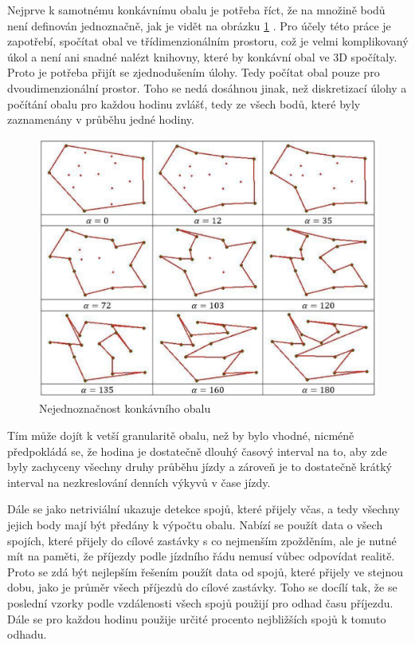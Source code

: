 Nejprve k samotnému konkávnímu obalu je potřeba říct, že na množině bodů není definován jednoznačně, jak je vidět na obrázku \ref{fig:konkavni_obal_nejednoznacny} \citet{Asaeedi}. Pro účely této práce je zapotřebí, spočítat obal ve třídimenzionálním prostoru, což je velmi komplikovaný úkol a není ani snadné nalézt knihovny, které by konkávní obal ve 3D spočítaly. Proto je potřeba přijít se zjednodušením úlohy. Tedy počítat obal pouze pro dvoudimenzionální prostor. Toho se nedá dosáhnou jinak, než diskretizací úlohy a počítání obalu pro každou hodinu zvlášť, tedy ze všech bodů, které byly zaznamenány v průběhu jedné hodiny.


\begin{figure}
\centering
  \includegraphics[width=0.8\linewidth]{../img/konkavni_obal_nejednoznacny.png}
  \caption{Nejednoznačnost konkávního obalu}
  \label{fig:konkavni_obal_nejednoznacny}
\end{figure}


\bigbreak


 Tím může dojít k vetší granularitě obalu, než by bylo vhodné, nicméně předpokládá se, že hodina je dostatečně dlouhý časový interval na to, aby zde byly zachyceny všechny druhy průběhu jízdy a zároveň je to dostatečně krátký interval na nezkreslování denních výkyvů v čase jízdy.


 \bigbreak


Dále se jako netriviální ukazuje detekce spojů, které přijely včas, a tedy všechny jejich body mají být předány k výpočtu obalu. Nabízí se použít data o všech spojích, které přijely do cílové zastávky s co nejmenším zpožděním, ale je nutné mít na paměti, že příjezdy podle jízdního řádu nemusí vůbec odpovídat realitě. Proto se zdá být nejlepším řešením použít data od spojů, které přijely ve stejnou dobu, jako je průměr všech příjezdů do cílové zastávky. Toho se docílí tak, že se poslední vzorky podle vzdálenosti všech spojů použijí pro odhad času příjezdu. Dále se pro každou hodinu použije určité procento nejbližších spojů k tomuto odhadu.


